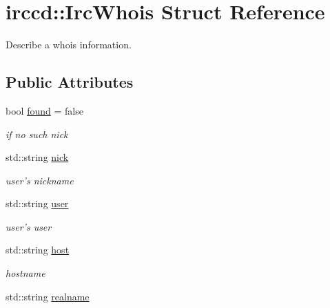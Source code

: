 \hypertarget{a00036}{\section{irccd\-:\-:Irc\-Whois Struct Reference}
\label{a00036}
}


Describe a whois information.  


\subsection*{Public Attributes}
\begin{DoxyCompactItemize}
\item 
\hypertarget{a00036_a37c418144a696482aad5118d1dad3987}{bool \hyperlink{a00036_a37c418144a696482aad5118d1dad3987}{found} = false}\label{a00036_a37c418144a696482aad5118d1dad3987}

\begin{DoxyCompactList}\small\item\em if no such nick \end{DoxyCompactList}\item 
\hypertarget{a00036_a07c5f6c7b0b7f1445a8e026b6c3db6c3}{std\-::string \hyperlink{a00036_a07c5f6c7b0b7f1445a8e026b6c3db6c3}{nick}}\label{a00036_a07c5f6c7b0b7f1445a8e026b6c3db6c3}

\begin{DoxyCompactList}\small\item\em user's nickname \end{DoxyCompactList}\item 
\hypertarget{a00036_a98777c7f2725169d7080e52317a5085f}{std\-::string \hyperlink{a00036_a98777c7f2725169d7080e52317a5085f}{user}}\label{a00036_a98777c7f2725169d7080e52317a5085f}

\begin{DoxyCompactList}\small\item\em user's user \end{DoxyCompactList}\item 
\hypertarget{a00036_aec19be84b675f7064f37cd1380bc1955}{std\-::string \hyperlink{a00036_aec19be84b675f7064f37cd1380bc1955}{host}}\label{a00036_aec19be84b675f7064f37cd1380bc1955}

\begin{DoxyCompactList}\small\item\em hostname \end{DoxyCompactList}\item 
\hypertarget{a00036_acc3bd017f902ef073e48674bdc24834c}{std\-::string \hyperlink{a00036_acc3bd017f902ef073e48674bdc24834c}{realname}}\label{a00036_acc3bd017f902ef073e48674bdc24834c}


\end{DoxyCompactItemize}
